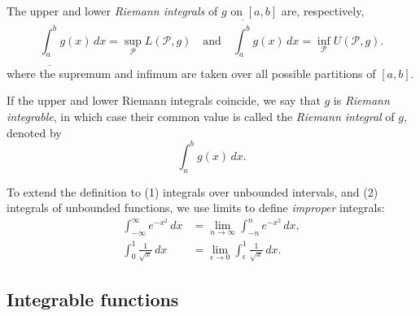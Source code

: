 
The upper and lower \emph{Riemann integrals} of $g$ on $[a,b]$ are, respectively,
\[
\underline{\int_a^b} g(x)\,dx = \sup_{\mathcal{P}} L(\mathcal{P},g)
\quad\text{and}\quad
\overline{\int_a^b} g(x)\,dx  = \inf_{\mathcal{P}} U(\mathcal{P},g).
\]
where the supremum and infimum are taken over all possible partitions of $[a,b]$.

\bigskip
If the upper and lower Riemann integrals coincide, we say that $g$ is \emph{Riemann integrable}, in which case their common value is called the \emph{Riemann integral} of $g$, denoted by
\[
\displaystyle\int_a^b g(x)\,dx.
\]

%

To extend the definition to (1) integrals over unbounded intervals, and (2) integrals of unbounded functions, we use limits to define \emph{improper} integrals:
\begin{align*}
\int_{-\infty}^{\infty} e^{-x^2}\,dx 		& = \lim_{n\to\infty} \int_{-n}^{n} e^{-x^2}\,dx, \\[2ex]
\int_0^1 \frac{1}{\sqrt{x}}\,dx			& = \lim_{\epsilon\to 0} \int_{\epsilon}^1 \frac{1}{\sqrt{x}}\,dx.
\end{align*}

\subsection{Integrable functions}

